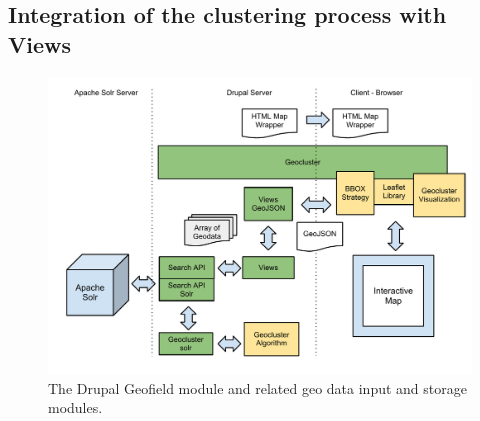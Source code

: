 \subsection{Integration of the clustering process with Views}





\begin{figure}[h]
  \begin{center}
    \includegraphics[width=1\textwidth]{figures/geocluster_solr_architecture.pdf}
    \caption{The Drupal Geofield module and related geo data input and storage modules.}
    \label{fig:geofield}
  \end{center}
\end{figure}
